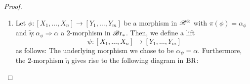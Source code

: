 \begin{proof}
\begin{enumerate}
        corresponding to the following diagrams:
        \begin{center}
        \end{center}


        The composition of two morphisms 
        \[
        g \colon [X_1, \dots, X_n] \to [X_1',
        \dots, X_n'], \; g \colon [X_1', \dots, X_n'] \to [X_1'', \dots, X_n'']
        \]
        is being respected as the composition of the unique lifts $\bar{f}$ and
        $\bar{f}'$ lift the diagram and therefore have to be the unique lift for
        $g' \circ g$ and $f$:
        \begin{center}
        \end{center}
        \item Let $\phi \colon [X_1, \dots, X_n] \to [Y_1, \dots, Y_m]$ be a
        morphism in $\mathscr{B}^{\otimes}$ with $\pi(\phi)=\alpha_{\phi}$ and $\widetilde{\eta} \colon
        \alpha_{\phi} \Rightarrow \alpha$ a $2$-morphism in $\mathscr{B} \text{r}_{\ast}$. Then, we
        define a lift
        \[
            \psi \colon [X_1, \dots, X_n] \to [Y_1, \dots, Y_m]
        \]
        as follows: The underlying morphism we chose to be
        $\alpha_{\psi}=\alpha$. Furthermore, the $2$-morphism $\widetilde{\eta}$ gives rise
        to the following diagram in $\operatorname{BR}$:
        \begin{center}
\end{center}
\end{enumerate}
\end{proof}
